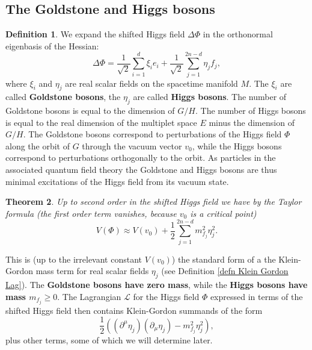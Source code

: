 \documentclass[11pt]{amsart}
\newtheorem{thm}{Theorem}[section]
\theoremstyle{definition}
\newtheorem{defn}[thm]{Definition}
\theoremstyle{remark}
\numberwithin{equation}{section}
\begin{document}
\subsection{The Goldstone and Higgs bosons}
\begin{defn}We expand the shifted Higgs field $\Delta\Phi$ in the orthonormal eigenbasis of the Hessian:
\begin{equation*}
\Delta\Phi=\frac{1}{\sqrt{2}}\sum_{i=1}^d\xi_ie_i+\frac{1}{\sqrt{2}}\sum_{j=1}^{2n-d}\eta_jf_j,
\end{equation*}
where $\xi_i$  and $\eta_j$ are real scalar fields on the spacetime manifold $M$. The $\xi_i$ are called {\bf Goldstone bosons}, the $\eta_j$ are called {\bf Higgs bosons}. The number of Goldstone bosons is equal to the dimension of $G/H$. The number of Higgs bosons is equal to the real dimension of the multiplet space $E$ minus the dimension of $G/H$. The Goldstone bosons correspond to perturbations of the Higgs field $\Phi$ along the orbit of $G$ through the vacuum vector $v_0$, while the Higgs bosons correspond to perturbations orthogonally to the orbit. As particles in the associated quantum field theory the Goldstone and Higgs bosons are thus minimal excitations of the Higgs field from its vacuum state.
\end{defn}
\begin{thm}\label{thm potential up to second order}
Up to second order in the shifted Higgs field we have by the Taylor formula (the first order term vanishes, because $v_0$ is a critical point)
\begin{equation*}
V(\Phi)\approx V(v_0)+\frac{1}{2}\sum_{j=1}^{2n-d} m_{f_j}^2\eta_j^2.
\end{equation*}
\end{thm}
This is (up to the irrelevant constant $V(v_0)$) the standard form of a the Klein-Gordon mass term for real scalar fields $\eta_j$ (see Definition \ref{defn Klein Gordon Lag}). The {\bf Goldstone bosons have zero mass}, while the {\bf Higgs bosons have mass $m_{f_j}\geq 0$}. The Lagrangian $\mathcal{L}$ for the Higgs field $\Phi$ expressed in terms of the shifted Higgs field then contains Klein-Gordon summands of the form 
\begin{equation*}
\frac{1}{2}\left((\partial^\mu\eta_j)(\partial_\mu\eta_j)-m_{f_j}^2\eta_j^2\right),
\end{equation*}
plus other terms, some of which we will determine later.
\end{document}
